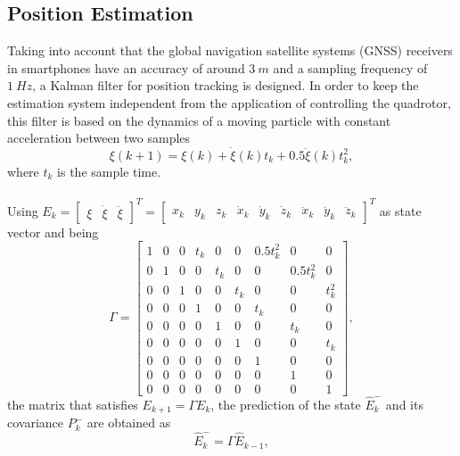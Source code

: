 \subsection{Position Estimation}
Taking into account that the global navigation satellite systems (GNSS) receivers in smartphones have an accuracy of around $3\ m$ and a sampling frequency of $1\ Hz$, a Kalman filter for position tracking is designed. In order to keep the estimation system independent from the application of controlling the quadrotor, this filter is based on the dynamics of a moving particle with constant acceleration between two samples
\begin{equation}
\xi(k+1) = \xi(k) + \dot{\xi}(k)t_{k} + 0.5\ddot{\xi}(k)t_{k}^{2},
\end{equation}
where $t_{k}$ is the sample time.\\\\
Using $E_{k} = \begin{bmatrix}
\xi & \dot{\xi} & \ddot{\xi}
\end{bmatrix}^{T}
 =
\begin{bmatrix}x_{k} & y_{k} & z_{k} & \dot{x}_{k} & \dot{y}_{k} & \dot{z}_{k} & \ddot{x}_{k} & \ddot{y}_{k} & \ddot{z}_{k} \end{bmatrix}^{T}$ as state vector and being 
\begin{equation}\label{eqn:A}
\Gamma = \begin{bmatrix}
   				 1 & 0 & 0 & t_{k} & 0 & 0 & 0.5t_{k}^{2} & 0 & 0\\
   				 0 & 1 & 0 & 0 & t_{k} & 0 & 0 & 0.5t_{k}^{2} & 0\\
   				 0 & 0 & 1 & 0 & 0 & t_{k} & 0 & 0 & t_{k}^{2}\\
   				 0 & 0 & 0 & 1 & 0 & 0 & t_{k} & 0 & 0\\
   				 0 & 0 & 0 & 0 & 1 & 0 & 0 & t_{k} & 0 \\
   				 0 & 0 & 0 & 0 & 0 & 1 & 0 & 0 & t_{k} \\
   				 0 & 0 & 0 & 0 & 0 & 0 & 1 & 0 & 0\\
   				 0 & 0 & 0 & 0 & 0 & 0 & 0 & 1 & 0\\
   				 0 & 0 & 0 & 0 & 0 & 0 & 0 & 0 & 1 
				\end{bmatrix},
\end{equation}
the matrix that satisfies $E_{k+1} = \Gamma E_{k}$, the prediction of the state $\hat{E}_{k}^{-}$ and its covariance $P_{k}^{-}$ are obtained as
\begin{equation}\label{eqn:statePrognosis}
\hat{E}_{k}^{-} = \Gamma \hat{E}_{k-1},
\end{equation}
